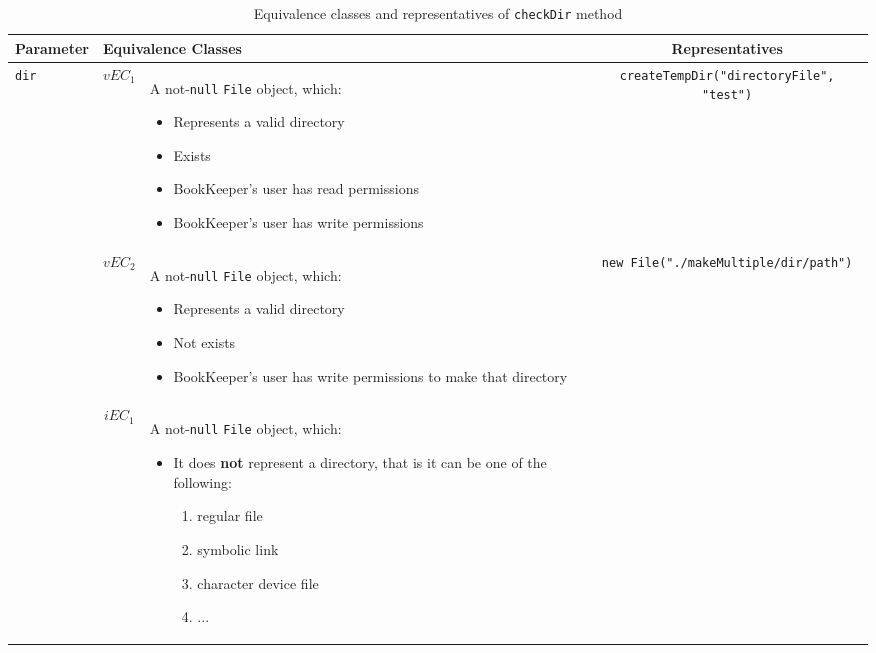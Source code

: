 \documentclass[sigconf]{acmart}
\begin{document}
\begin{table*}
\footnotesize
\caption{Equivalence classes and representatives of \texttt{checkDir} method}
\label{checkDirEq}
\centering
\begin{tabular}{l|cm{10.5cm}|c}
\toprule

    \textbf{Parameter} & \multicolumn{2}{|l|}{\textbf{Equivalence Classes}} & \textbf{Representatives} \\
    \midrule
    
	\texttt{dir} & $vEC_1$ & A not-\texttt{null} \texttt{File} object, which: 
	
	\begin{itemize}
	\item Represents a valid directory
	\item Exists
	\item BookKeeper's user has read permissions
	\item BookKeeper's user has write permissions
	\end{itemize}
	
	& \texttt{createTempDir("directoryFile", "test")}   
    
    \\\cline{2-4}   
    & $vEC_2$ & A not-\texttt{null} \texttt{File} object, which: 
    
    \begin{itemize}
	\item Represents a valid directory
	\item Not exists
	\item BookKeeper's user has write permissions to make that directory
	\end{itemize}
    
    & \texttt{new File("./makeMultiple/dir/path")}
    
    \\\cline{2-4}   
    & $iEC_1$ & A not-\texttt{null} \texttt{File} object, which: 
    
    \begin{itemize}
	\item It does \textbf{not} represent a directory, that is it can be one of the following:
	\begin{enumerate}
	\item regular file
	\item symbolic link
	\item character device file
	\item ...
	\end{enumerate}
	\end{itemize}
    

\end{tabular}
\end{table*}
\end{document}
